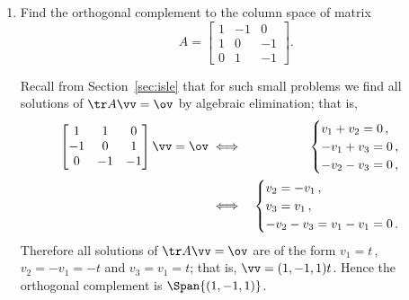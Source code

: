 \begin{example}
\begin{enumerate}
\item\label{eg:nulltrw:c} Find the orthogonal complement to the column space of matrix
\begin{equation*}
A=\begin{bmatrix} 1&-1&0\\ 1&0&-1\\ 0&1&-1 \end{bmatrix}.
\end{equation*}
\begin{solution} 
Recall from Section~\ref{sec:isle} that for such small problems we find all solutions of \(\tr A\vv=\ov\) by algebraic elimination; that is,
\begin{eqnarray*}
\begin{bmatrix} 1&1&0\\-1&0&1\\ 0&-1&-1 \end{bmatrix}\vv=\ov
&\iff&
\begin{cases}
v_1+v_2=0\,,\\
-v_1+v_3=0\,,\\
-v_2-v_3=0\,,
\end{cases}
\\&\iff&\begin{cases}
v_2=-v_1\,,\\
v_3=v_1\,,\\
-v_2-v_3=v_1-v_1=0\,.
\end{cases}
\end{eqnarray*}
Therefore all solutions of \(\tr A\vv=\ov\) are of the form \(v_1=t\)\,, \(v_2=-v_1=-t\) and \(v_3=v_1=t\); that is, \(\vv=(1,-1,1)t\).
Hence the orthogonal complement is \(\Span\{(1,-1,1)\}\).
\end{solution}


\end{enumerate}
\end{example}
